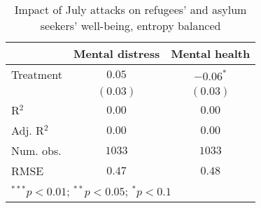 
\begin{table}
\caption{Impact of July attacks on refugees' and asylum seekers' well-being, entropy balanced}
\begin{center}
\begin{tabular}{l c c}
\toprule
 & Mental distress & Mental health \\
\midrule
Treatment  & $0.05$   & $-0.06^{*}$ \\
           & $(0.03)$ & $(0.03)$    \\
\midrule
R$^2$      & $0.00$   & $0.00$      \\
Adj. R$^2$ & $0.00$   & $0.00$      \\
Num. obs.  & $1033$   & $1033$      \\
RMSE       & $0.47$   & $0.48$      \\
\bottomrule
\multicolumn{3}{l}{\scriptsize{$^{***}p<0.01$; $^{**}p<0.05$; $^{*}p<0.1$}}
\end{tabular}
\label{tab_mhealth_match}
\end{center}
\end{table}
